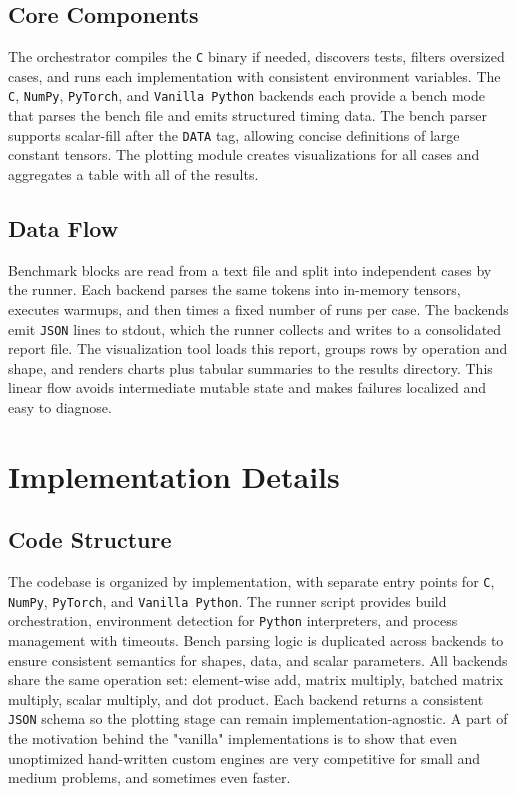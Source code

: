 \documentclass[a4paper,12pt]{article}
\begin{document}
\subsection{Core Components}
The orchestrator compiles the \texttt{C} binary if needed, discovers tests, filters oversized cases, and runs each implementation with consistent environment variables. The \texttt{C}, \texttt{NumPy}, \texttt{PyTorch}, and \texttt{Vanilla Python} backends each provide a bench mode that parses the bench file and emits structured timing data. The bench parser supports scalar-fill after the \texttt{DATA} tag, allowing concise definitions of large constant tensors. The plotting module creates visualizations for all cases and aggregates a table with all of the results.

\subsection{Data Flow}
Benchmark blocks are read from a text file and split into independent cases by the runner. Each backend parses the same tokens into in-memory tensors, executes warmups, and then times a fixed number of runs per case. The backends emit \texttt{JSON} lines to stdout, which the runner collects and writes to a consolidated report file. The visualization tool loads this report, groups rows by operation and shape, and renders charts plus tabular summaries to the results directory. This linear flow avoids intermediate mutable state and makes failures localized and easy to diagnose.

\section{Implementation Details}
\subsection{Code Structure}
The codebase is organized by implementation, with separate entry points for \texttt{C}, \texttt{NumPy}, \texttt{PyTorch}, and \texttt{Vanilla Python}. The runner script provides build orchestration, environment detection for \texttt{Python} interpreters, and process management with timeouts. Bench parsing logic is duplicated across backends to ensure consistent semantics for shapes, data, and scalar parameters. All backends share the same operation set: element-wise add, matrix multiply, batched matrix multiply, scalar multiply, and dot product. Each backend returns a consistent \texttt{JSON} schema so the plotting stage can remain implementation-agnostic. A part of the motivation behind the "vanilla" implementations is to show that even unoptimized hand-written custom engines are very competitive for small and medium problems, and sometimes even faster. 
\end{document}

